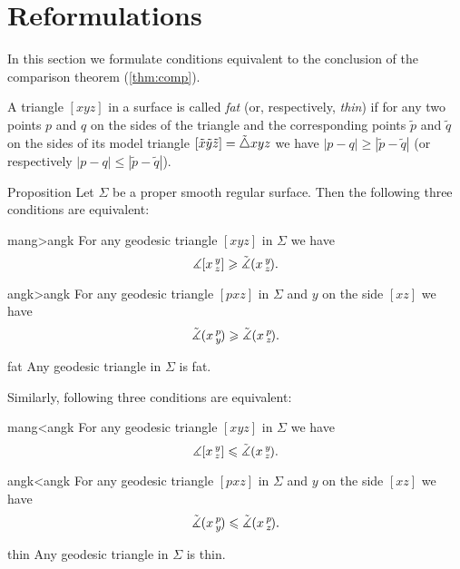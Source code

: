 \section{Reformulations}

In this section we formulate conditions equivalent to the conclusion of the comparison theorem (\ref{thm:comp}).

A triangle $[xyz]$ in a surface is called \emph{fat} (or, respectively, \emph{thin})
if for any two points $p$ and $q$ on the sides of the triangle and the corresponding points 
$\tilde p$ and $\tilde q$ on the sides of its model triangle $[\tilde x\tilde y\tilde z]\z=\tilde\triangle xyz$ we have
$|p-q|\ge |\tilde p-\tilde q|$ (or respectively $|p-q|\le |\tilde p-\tilde q|$).


\begin{thm}{Proposition}\label{prop:comp-reformulations}
Let $\Sigma$ be a proper smooth regular surface.
Then the following three conditions are equivalent:

\begin{subthm}{mang>angk}
For any geodesic triangle $[xyz]$ in $\Sigma$ we have
 \[\measuredangle[x\,{}^{y}_{z}]\geqslant\tilde\measuredangle(x\,{}^{y}_{z}\hspace{-0.2ex}).\]
\end{subthm}

\begin{subthm}{angk>angk} For any geodesic triangle $[pxz]$ in $\Sigma$ and $y$ on the side $[xz]$ we have
 \[\tilde\measuredangle(x\,{}^{p}_{y}\hspace{-0.2ex}) \geqslant \tilde\measuredangle(x\,{}^{p}_{z}\hspace{-0.2ex}).\]
 
\end{subthm}

\begin{subthm}{fat}
 Any geodesic triangle in $\Sigma$ is fat.
\end{subthm}


\medskip

Similarly, following three conditions are equivalent:

\begin{subthmA}{mang<angk}
For any geodesic triangle $[xyz]$ in $\Sigma$ we have
 \[\measuredangle[x\,{}^{y}_{z}]\leqslant\tilde\measuredangle(x\,{}^{y}_{z}\hspace{-0.2ex}).\]
\end{subthmA}

\begin{subthmA}{angk<angk} For any geodesic triangle $[pxz]$ in $\Sigma$ and $y$ on the side $[xz]$ we have
 \[\tilde\measuredangle(x\,{}^{p}_{y}\hspace{-0.2ex}) \leqslant \tilde\measuredangle(x\,{}^{p}_{z}\hspace{-0.2ex}).\]
\end{subthmA}

\begin{subthmA}{thin}
Any geodesic triangle in $\Sigma$ is thin.
\end{subthmA}

\end{thm}

